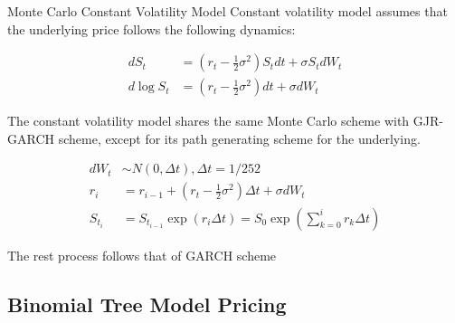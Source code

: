 \documentclass[8pt]{beamer}
\numberwithin{equation}{section}
\begin{document}
\begin{frame}{Monte Carlo Constant Volatility Model}
Constant volatility model assumes that the underlying price follows the following dynamics:

\begin{equation}
\begin{aligned}
dS_t &= (r_t - \frac 12 \sigma^2)S_t dt + \sigma S_t dW_t
\\
d\log S_t &= (r_t - \frac 12 \sigma^2) dt + \sigma dW_t
\end{aligned}
\end{equation}

The constant volatility model shares the same Monte Carlo scheme with GJR-GARCH scheme, except for its path generating scheme for the underlying.

\begin{equation}
\begin{aligned}
dW_t &\sim N(0,\Delta t), \Delta t = 1/252
\\
r_i &= r_{i-1} + (r_t - \frac 12 \sigma^2) \Delta t + \sigma dW_t
\\
S_{t_i} &=S_{t_{i-1}}\exp(r_i \Delta t) = S_0\exp(\sum_{k=0}^i r_k \Delta t)
\end{aligned}
\end{equation}

The rest process follows that of GARCH scheme

\end{frame}

\subsection{Binomial Tree Model Pricing}
\end{document}
